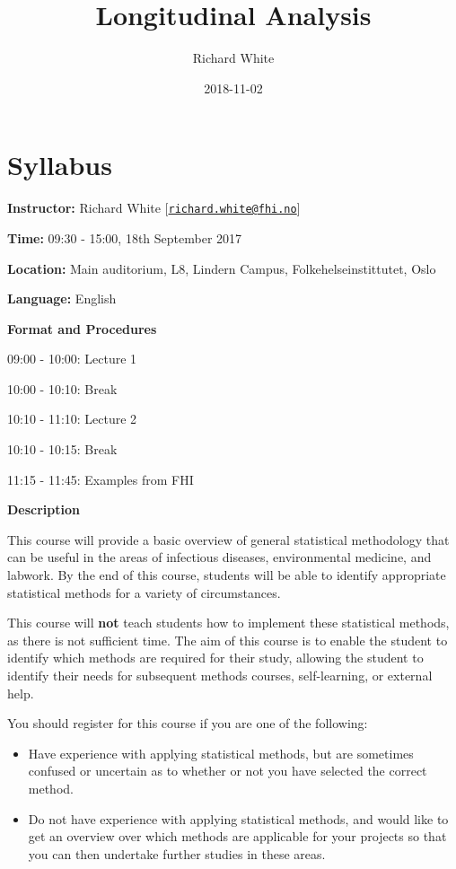 \documentclass[]{book}
\title{Longitudinal Analysis}
\author{Richard White}
\date{2018-11-02}
\providecommand{\tightlist}{%
  \setlength{\itemsep}{0pt}\setlength{\parskip}{0pt}}
\begin{document}
\maketitle

{
\setcounter{tocdepth}{1}
\tableofcontents
}
\chapter{Syllabus}\label{syllabus}

\textbf{Instructor:} Richard White
{[}\href{mailto:richard.white@fhi.no}{\nolinkurl{richard.white@fhi.no}}{]}

\textbf{Time:} 09:30 - 15:00, 18th September 2017

\textbf{Location:} Main auditorium, L8, Lindern Campus,
Folkehelseinstittutet, Oslo

\textbf{Language:} English

\textbf{Format and Procedures}

09:00 - 10:00: Lecture 1

10:00 - 10:10: Break

10:10 - 11:10: Lecture 2

10:10 - 10:15: Break

11:15 - 11:45: Examples from FHI

\textbf{Description}

This course will provide a basic overview of general statistical
methodology that can be useful in the areas of infectious diseases,
environmental medicine, and labwork. By the end of this course, students
will be able to identify appropriate statistical methods for a variety
of circumstances.

This course will \textbf{not} teach students how to implement these
statistical methods, as there is not sufficient time. The aim of this
course is to enable the student to identify which methods are required
for their study, allowing the student to identify their needs for
subsequent methods courses, self-learning, or external help.

You should register for this course if you are one of the following:

\begin{itemize}
\tightlist
\item
  Have experience with applying statistical methods, but are sometimes
  confused or uncertain as to whether or not you have selected the
  correct method.
\item
  Do not have experience with applying statistical methods, and would
  like to get an overview over which methods are applicable for your
  projects so that you can then undertake further studies in these
  areas.
\end{itemize}
\end{document}
